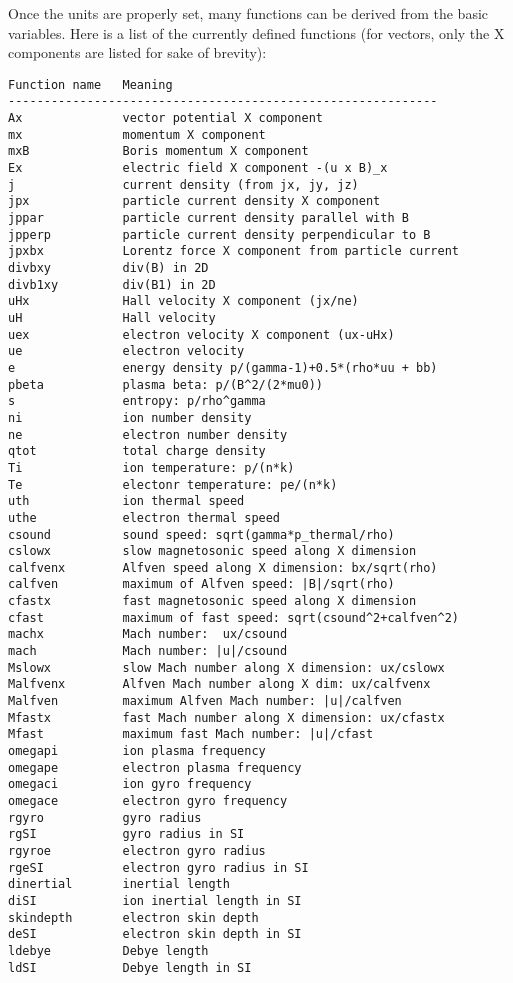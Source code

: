\documentclass{article}
\begin{document}
   Once the units are properly set, many functions can be derived
   from the basic variables. Here is a list of the currently 
   defined functions (for vectors, only the X components are 
   listed for sake of brevity):
\begin{verbatim}
Function name   Meaning
------------------------------------------------------------
Ax              vector potential X component
mx              momentum X component
mxB             Boris momentum X component
Ex              electric field X component -(u x B)_x
j               current density (from jx, jy, jz)
jpx             particle current density X component
jppar           particle current density parallel with B
jpperp          particle current density perpendicular to B
jpxbx           Lorentz force X component from particle current
divbxy          div(B) in 2D
divb1xy         div(B1) in 2D
uHx             Hall velocity X component (jx/ne)
uH              Hall velocity 
uex             electron velocity X component (ux-uHx)
ue              electron velocity
e               energy density p/(gamma-1)+0.5*(rho*uu + bb)
pbeta           plasma beta: p/(B^2/(2*mu0))
s               entropy: p/rho^gamma
ni              ion number density        
ne              electron number density   
qtot            total charge density
Ti              ion temperature: p/(n*k)
Te              electonr temperature: pe/(n*k)
uth             ion thermal speed
uthe            electron thermal speed
csound          sound speed: sqrt(gamma*p_thermal/rho)
cslowx          slow magnetosonic speed along X dimension
calfvenx        Alfven speed along X dimension: bx/sqrt(rho)
calfven         maximum of Alfven speed: |B|/sqrt(rho)
cfastx          fast magnetosonic speed along X dimension
cfast           maximum of fast speed: sqrt(csound^2+calfven^2)
machx           Mach number:  ux/csound
mach            Mach number: |u|/csound
Mslowx          slow Mach number along X dimension: ux/cslowx
Malfvenx        Alfven Mach number along X dim: ux/calfvenx
Malfven         maximum Alfven Mach number: |u|/calfven
Mfastx          fast Mach number along X dimension: ux/cfastx
Mfast           maximum fast Mach number: |u|/cfast
omegapi         ion plasma frequency                                 
omegape         electron plasma frequency
omegaci         ion gyro frequency        
omegace         electron gyro frequency 
rgyro           gyro radius               
rgSI            gyro radius in SI         
rgyroe          electron gyro radius      
rgeSI           electron gyro radius in SI
dinertial       inertial length           
diSI            ion inertial length in SI 
skindepth       electron skin depth       
deSI            electron skin depth in SI 
ldebye          Debye length              
ldSI            Debye length in SI        
\end{verbatim}
\end{document}
